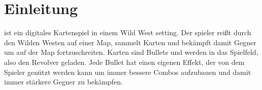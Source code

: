 
\section{Einleitung}\label{sec:einleitung}

\renewcommand{\kapitelautor}{Autor: Philip Jankovic}


\FF ist ein digitales Kartenspiel in einem Wild West setting. Der spieler reißt durch den Wilden Westen auf einer Map,
sammelt Karten und bekämpft damit Gegner um auf der Map fortzuschreiten. Karten sind Bullets und werden in das Spielfeld, also den Revolver geladen.
Jede Bullet hat einen eigenen Effekt, der von dem Spieler genützt werden kann um immer bessere Combos aufzubauen und damit immer stärkere Gegner zu bekämpfen.


%

\renewcommand{\kapitelautor}{}
